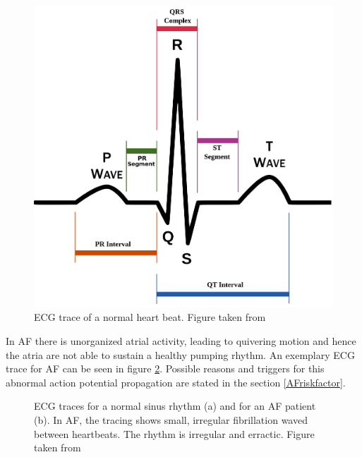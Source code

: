\begin{figure}[H]
\begin{center}
\includegraphics[scale=0.3]{./teile/introduction/ecg_2.png}
\caption{ECG trace of a normal heart beat. Figure taken from \cite{afib}}
\label{ecg}
\end{center}
\end{figure}

In AF there is unorganized atrial activity, leading to quivering motion and hence the atria are not able to sustain a healthy pumping rhythm. 
An exemplary ECG trace for AF can be seen in figure \ref{af_ecg}. 
Possible reasons and triggers for this abnormal action potential propagation are stated in the section \ref{AFriskfactor}.

\begin{figure}[H]
\begin{center}
\caption{ECG traces for a normal sinus rhythm (a) and for an AF patient (b). In AF, the tracing shows small, irregular fibrillation waved 
between heartbeats. The rhythm is irregular and erractic. Figure taken from \cite{afib}}
\label{af_ecg}
\end{center}
\end{figure}


